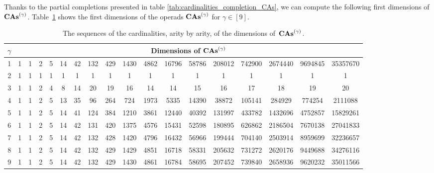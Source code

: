 Thanks to the partial completions presented in table
\ref{tab:cardinalities_completion_CAs}, we can compute the following 
first dimensions of $\mathbf{CAs}^{\left(\gamma\right)}$. Table~\ref{tab:dimensions_CAs}
 shows the first dimensions of the
operads $\mathbf{CAs}^{\left(\gamma\right)}$ for $\gamma \in [9]$.
\begin{table}[ht]
    \centering
    \footnotesize
    \setlength{\tabcolsep}{.35em}
    \begin{tabular}{c||ccccccccccccccccc}
        $\gamma$ & \multicolumn{17}{c}{Dimensions of $\mathbf{CAs}^{\left(\gamma\right)}$}
        \\ \hline \hline
        1 & 1 & 1 & 2 & 5 & 14 & 42 & 132 & 429 & 1430 & 4862
        & 16796 & 58786 & 208012 & 742900 & 2674440 & 9694845
        & 35357670
        \\
        2 & 1 & 1 & 1 & 1 & 1 & 1 & 1 & 1 & 1 & 1 & 1 & 1 & 1 & 1 & 1
        & 1 & 1
        \\
        3 & 1 & 1 & 2 & 4 & 8 & 14 & 20 & 19 & 16 & 14 &
        14 & 15 & 16 & 17 & 18 & 19 & 20
        \\
        4 & 1 & 1 & 2 & 5 & 13 & 35 & 96 & 264 & 724 & 1973 & 5335
        & 14390 & 38872 & 105141 & 284929 & 774254 & 2111088
        \\
        5 & 1 & 1 & 2 & 5 & 14 & 41 & 124 & 384 & 1210 & 3861 & 12440
        & 40392 & 131997 & 433782 & 1432696 & 4752857
        & 15829261
        \\
        6 & 1 & 1 & 2 & 5 & 14 & 42 & 131 & 420 & 1375 & 4576 & 15431
        & 52598 & 180895 & 626862 & 2186504 & 7670138
        & 27041833
        \\
        7 & 1 & 1 & 2 & 5 & 14 & 42 & 132 & 428 & 1420 & 4796 & 16432
        & 56966 & 199444 & 704140 & 2503914 & 8959699
        & 32236657
        \\
        8 & 1 & 1 & 2 & 5 & 14 & 42 & 132 & 429 & 1429 & 4851 & 16718
        & 58331 & 205632 & 731272 & 2620176 & 9449688 & 34276116
        \\
        9 & 1 & 1 & 2 & 5 & 14 & 42 & 132 & 429 & 1430 & 4861 & 16784
        & 58695 & 207452 & 739840 & 2658936 & 9620232 & 35011566
    \end{tabular}
    \medbreak

    \caption{\footnotesize
    The sequences of the cardinalities, arity by arity, of the
    dimensions of~$\mathbf{CAs}^{\left(\gamma\right)}$.}
    \label{tab:dimensions_CAs}
\end{table}
\medbreak


